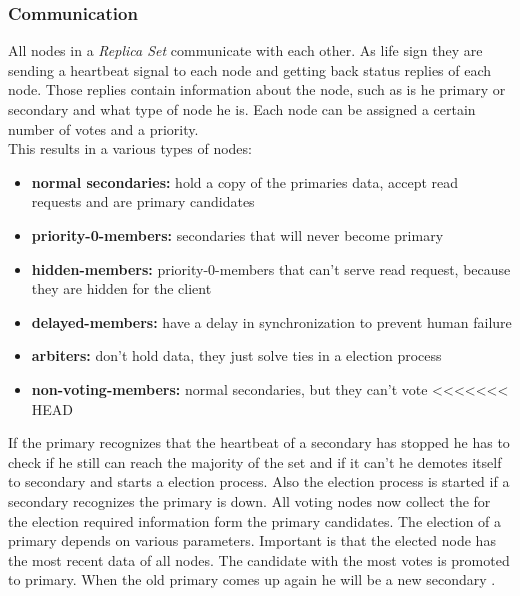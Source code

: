 \subsubsection{Communication}
All nodes in a \textit{Replica Set} communicate with each other. As life sign they are sending a heartbeat signal to each node and getting back status replies of each node. Those replies contain information about the node, such as is he primary or secondary and what type of node he is. Each node can be assigned a certain number of votes and a priority.\\
This results in a various types of nodes:
\begin{itemize}
>>>>>>> 392254b60d3c8037fdb1e0389fac7e060ba40341
  \item \textbf{normal secondaries:} hold a copy of the primaries data, accept read requests and are primary candidates
  \item \textbf{priority-0-members:} secondaries that will never become primary
  \item \textbf{hidden-members:} priority-0-members that can't serve read request, because they are hidden for the client
  \item \textbf{delayed-members:} have a delay in synchronization to prevent human failure
  \item \textbf{arbiters:} don't hold data, they just solve ties in a election process
  \item \textbf{non-voting-members:} normal secondaries, but they can't vote
<<<<<<< HEAD
\end{itemize}
If the primary recognizes that the heartbeat of a secondary has stopped he has to check if he still can reach the majority of the set and if it can't he demotes itself to secondary and starts a election process. Also the election process is started if a secondary recognizes the primary is down. All voting nodes now collect the for the election required information form the primary candidates. The election of a primary depends on various parameters. Important is that the elected node has the most recent data of all nodes. The candidate with the most votes is promoted to primary. When the old primary comes up again he will be a new secondary \cite{pracmong,theguide}.

